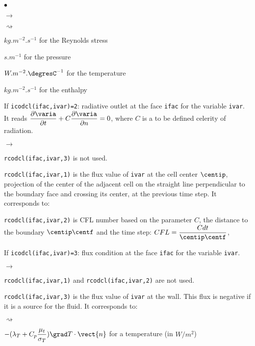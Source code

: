 {{{\begin{list}{$\bullet$}{}
\begin{list}{$\rightarrow$}{}
\begin{list}{$\rightsquigarrow$}{}
\item $kg.m^{-2}.s^{-1}$ for the Reynolds stress

\item $s.m^{-1}$ for the pressure

\item $W.m^{-2}.\mbox{\degresC}^{-1}$ for the temperature

\item $kg.m^{-2}.s^{-1}$ for the enthalpy
\end{list}

\end{list}

\item If \texttt{icodcl(ifac,ivar)=2}: radiative outlet at the face \texttt{ifac}
      for the variable \texttt{ivar}. It reads $ \dfrac{\partial \varia }{\partial t} + C \dfrac{\partial \varia}{\partial n} = 0 $, where $C$ is a to be defined celerity of radiation.

\begin{list}{$\rightarrow$}{}
\item \texttt{rcodcl(ifac,ivar,3)} is not used.

\item \texttt{rcodcl(ifac,ivar,1)} is the flux value of \texttt{ivar} at the cell center $\centip$,
      projection of the center of the adjacent cell on the straight line
      perpendicular to the boundary face and crossing its center,
      at the previous time step.
      It corresponds to:
\item \texttt{rcodcl(ifac,ivar,2)} is CFL number based on the parameter $C$,
      the distance to the boundary $\centip \centf$ and the time step:
      $CFL = \dfrac{C dt }{\centip \centf}$,

\end{list}

\item If \texttt{icodcl(ifac,ivar)=3}: flux condition at the face \texttt{ifac}
      for the variable \texttt{ivar}.

\begin{list}{$\rightarrow$}{}
\item \texttt{rcodcl(ifac,ivar,1)} and \texttt{rcodcl(ifac,ivar,2)} are not used.

\item \texttt{rcodcl(ifac,ivar,3)} is the flux value of \texttt{ivar} at the
      wall. This flux is negative if it is a source for the fluid. It corresponds to:
\begin{list}{$\rightsquigarrow$}{}
\item
$\displaystyle -(\lambda_T+C_p\frac{\mu_t}{\sigma_T})\grad T\cdot\vect{n}$ for a temperature (in $W/m^2$)


\end{list}
\end{list}
\end{list}}}}
